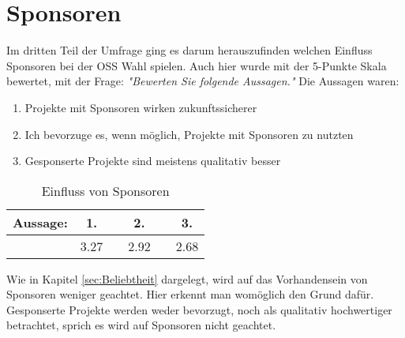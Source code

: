 \section{Sponsoren}\label{sec:umfrage_sponsoren}


Im dritten Teil der Umfrage ging es darum herauszufinden welchen Einfluss Sponsoren bei der OSS Wahl
spielen. Auch hier wurde mit der 5-Punkte Skala bewertet, mit der Frage: \textit{"Bewerten Sie folgende
    Aussagen."} Die Aussagen waren:

\begin{enumerate}
    \setlength\itemsep{0em}
    \item Projekte mit Sponsoren wirken zukunftssicherer
    \item Ich bevorzuge es, wenn möglich, Projekte mit Sponsoren zu nutzten
    \item Gesponserte Projekte sind meistens qualitativ besser
\end{enumerate}

\begin{table}[h]
    \begin{tabular}{cccccc}
        \hline
        Aussage: \hspace{1cm} & 1.   & \hspace{0.75cm} & 2.   & \hspace{0.75cm} & 3.   \\ \hline
                              & 3.27 &                 & 2.92 &                 & 2.68
    \end{tabular}%
    \caption{\label{tab:sponsorens}Einfluss von Sponsoren}
\end{table}


\noindent
{}

Wie in Kapitel \ref{sec:Beliebtheit} dargelegt, wird auf das Vorhandensein von Sponsoren weniger geachtet.
Hier erkennt man womöglich den Grund dafür.
Gesponserte Projekte werden weder bevorzugt, noch als qualitativ
hochwertiger betrachtet, sprich es wird auf Sponsoren nicht geachtet.
